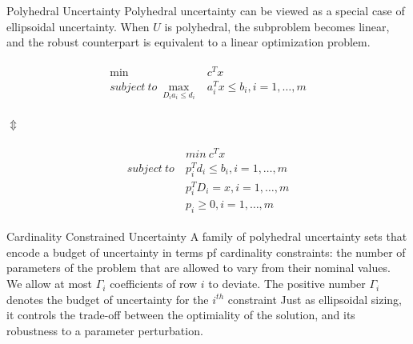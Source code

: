 \documentclass{beamer}
\begin{document}
\begin{frame}{Polyhedral Uncertainty}
Polyhedral uncertainty can be viewed as a special case of ellipsoidal uncertainty.
When $U$ is polyhedral, the subproblem becomes linear, and the robust counterpart is equivalent to a linear optimization problem.

\begin{align*}
\begin{split}
\min~&c^Tx \\
subject~to~\max_{D_i a_i \leq d_i} &a_{i}^{T}x \leq b_{i}, i=1,\dots,m
\end{split}
\end{align*}

$\Updownarrow$

\begin{align*}
\begin{split}
& min ~ c^Tx  \\
subject~to~& p_i^Td_i \leq b_i, i=1,\dots,m\\
& p_i^TD_i = x, i=1,\dots,m \\
& p_i \geq 0, i=1,\dots,m
\end{split}
\end{align*}
\end{frame}

\begin{frame}{Cardinality Constrained Uncertainty}
A family of polyhedral uncertainty sets that encode a budget of uncertainty in terms pf cardinality constraints: the number of parameters of the problem that are allowed to vary from their nominal values.
We allow at most $\Gamma_{i}$ coefficients of row $i$ to deviate.
The positive number $\Gamma_{i}$ denotes the budget of uncertainty for the $i^{th}$ constraint
Just as ellipsoidal sizing, it controls the trade-off between the optimiality of the solution, and its robustness to a parameter perturbation.
\end{frame}
\end{document}

